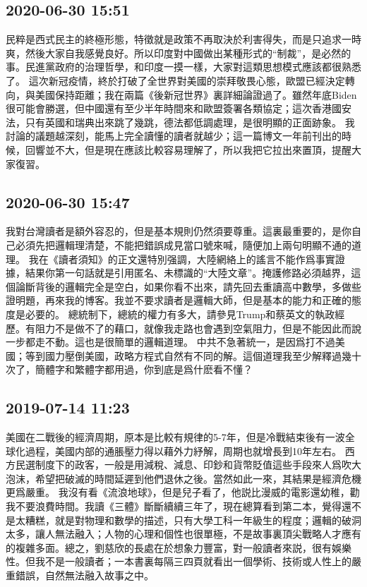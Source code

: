 \documentclass[twocolumn]{ctexart}
\begin{document}
\subsection*{2020-06-30 15:51}

民粹是西式民主的終極形態，特徵就是政策不再取決於利害得失，而是只追求一時爽，然後大家自我感覺良好。所以印度對中國做出某種形式的“制裁”，是必然的事。民進黨政府的治理哲學，和印度一摸一樣，大家對這類思想模式應該都很熟悉了。
這次新冠疫情，終於打破了全世界對美國的崇拜敬畏心態，歐盟已經決定轉向，與美國保持距離；我在兩篇《後新冠世界》裏詳細論證過了。雖然年底Biden很可能會勝選，但中國還有至少半年時間來和歐盟簽署各類協定；這次香港國安法，只有英國和瑞典出來跳了幾跳，德法都低調處理，是很明顯的正面跡象。
我討論的議題越深刻，能馬上完全讀懂的讀者就越少；這一篇博文一年前刊出的時候，回響並不大，但是現在應該比較容易理解了，所以我把它拉出來置頂，提醒大家復習。
\subsection*{2020-06-30 15:47}

我對台灣讀者是額外容忍的，但是基本規則仍然須要尊重。這裏最重要的，是你自己必須先把邏輯理清楚，不能把錯誤成見當口號來喊，隨便加上兩句明顯不通的道理。
我在《讀者須知》的正文還特別强調，大陸網絡上的謠言不能作爲事實證據，結果你第一句話就是引用匿名、未標識的“大陸文章”。掩護修路必須越界，這個論斷背後的邏輯完全是空白，如果你看不出來，請先回去重讀高中數學，多做些證明題，再來我的博客。我並不要求讀者是邏輯大師，但是基本的能力和正確的態度是必要的。
總統制下，總統的權力有多大，請參見Trump和蔡英文的執政經歷。有阻力不是做不了的藉口，就像我走路也會遇到空氣阻力，但是不能因此而說一步都走不動。這也是很簡單的邏輯道理。
中共不急著統一，是因爲打不過美國；等到國力壓倒美國，政略方程式自然有不同的解。這個道理我至少解釋過幾十次了，簡體字和繁體字都用過，你到底是爲什麽看不懂？
\subsection*{2019-07-14 11:23}

美國在二戰後的經濟周期，原本是比較有規律的5-7年，但是冷戰結束後有一波全球化過程，美國内部的通脹壓力得以藉外力紓解，周期也就增長到10年左右。 
西方民選制度下的政客，一般是用減稅、減息、印鈔和貨幣貶值這些手段來人爲吹大泡沫，希望把破滅的時間延遲到他們退休之後。當然如此一來，其結果是經濟危機更爲嚴重。 
我沒有看《流浪地球》，但是兒子看了，他説比漫威的電影還幼稚，勸我不要浪費時間。我讀《三體》斷斷續續三年了，現在總算看到第二本，覺得還不是太糟糕，就是對物理和數學的描述，只有大學工科一年級生的程度；邏輯的破洞太多，讓人無法融入；人物的心理和個性也很單極，不是故事裏頂尖戰略人才應有的複雜多面。總之，劉慈欣的長處在於想象力豐富，對一般讀者來説，很有娛樂性。但我不是一般讀者；一本書裏每隔三四頁就看出一個學術、技術或人性上的嚴重錯誤，自然無法融入故事之中。
\end{document}
